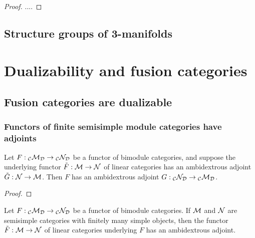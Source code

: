 \documentclass{amsart}
\begin{document}
\begin{proof}
	....
\end{proof}

\subsection{Structure groups of 3-manifolds} \label{sec-lft-struc}



\section{Dualizability and fusion categories} \label{sec-dualfusion}


\subsection{Fusion categories are dualizable} \label{sec-df-fcd}



\subsubsection{Functors of finite semisimple module categories have adjoints} \label{sec-df-functors}


\begin{lemma}
Let $F: {}_{\mathcal C} {\mathcal M}_{\mathcal D} \rightarrow {}_{\mathcal C} {\mathcal N}_{\mathcal D}$ be a functor of bimodule categories, and suppose the underlying functor $\tilde{F}: \mathcal M \rightarrow \mathcal N$ of linear categories has an ambidextrous adjoint $\tilde{G}: \mathcal N \rightarrow \mathcal M$.  Then $F$ has an ambidextrous adjoint $G: {}_{\mathcal C} {\mathcal N}_{\mathcal D} \rightarrow {}_{\mathcal C} {\mathcal M}_{\mathcal D}$.
\end{lemma}

\begin{proof}
\end{proof}

\begin{lemma}
Let $F: {}_{\mathcal C} {\mathcal M}_{\mathcal D} \rightarrow {}_{\mathcal C} {\mathcal N}_{\mathcal D}$ be a functor of bimodule categories.  If $\mathcal M$ and $\mathcal N$ are semisimple categories with finitely many simple objects, then the functor $\tilde{F}: \mathcal M \rightarrow \mathcal N$ of linear categories underlying $F$ has an ambidextrous adjoint.
\end{lemma}
\end{document}
